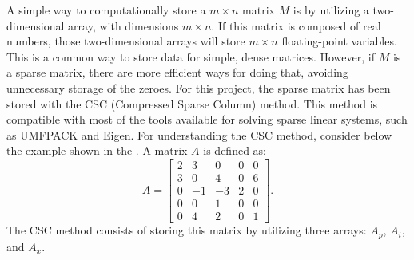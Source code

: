 A simple way to computationally store a $m \times n$ matrix $M$ is by utilizing a two-dimensional array, with dimensions $m \times n$. 
%
If this matrix is composed of real numbers, those two-dimensional arrays will store $m \times n$ floating-point variables. 
%
This is a common way to store data for simple, dense matrices. 
%
However, if $M$ is a sparse matrix, there are more efficient ways for doing that, avoiding unnecessary storage of the zeroes. 
%
For this project, the sparse matrix has been stored with the CSC (Compressed Sparse Column) method. 
%
This method is compatible with most of the tools available for solving sparse linear systems, such as UMFPACK and Eigen. 
%
For understanding the CSC method, consider below the example shown in the \cite{Davis1995}. 
%
A matrix $A$ is defined as:
%
\begin{equation}
	A = 
	\begin{bmatrix}
		2	&3	&0	&0	&0\\
		3	&0	&4	&0	&6\\
		0	&-1	&-3	&2	&0\\
		0	&0	&1	&0	&0\\
		0	&4	&2	&0	&1
	\end{bmatrix}
	.
\end{equation}
%
The CSC method consists of storing this matrix by utilizing three arrays: $A_p$, $A_i$, and $A_x$. 

